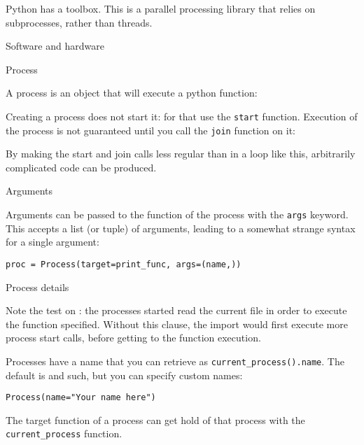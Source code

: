 
\lstset{language=Python}

Python has a  toolbox.
This is a parallel processing library that relies on subprocesses,
rather than threads.

 {Software and hardware}


 {Process}

A process is an object that will execute a python function:

Creating a process does not start it:
for that use the \lstinline{start} function.
Execution of the process is not guaranteed until you call the \lstinline{join}
function on it:

By making the start and join calls less regular than
in a loop like this,
arbitrarily complicated code can be produced.

 {Arguments}

Arguments can be passed to the function of the process
with the \lstinline{args} keyword.
This accepts a list (or tuple) of arguments,
leading to a somewhat strange syntax for a single argument:
\begin{lstlisting}
proc = Process(target=print_func, args=(name,))
\end{lstlisting}

 {Process details}

Note the test on :
the processes started read the current file in order to execute
the function specified.
Without this clause, the import would first execute more process start calls,
before getting to the function execution.

Processes have a name that you can retrieve as
\lstinline+current_process().name+.
The default is  and such,
but you can specify custom names:
\begin{lstlisting}
Process(name="Your name here")
\end{lstlisting}
The target function of a process can get hold of that process
with the  \lstinline+current_process+ function.


